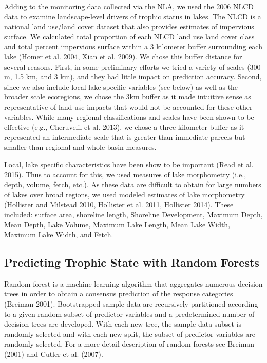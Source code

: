 \documentclass[12pt,]{article}
\begin{document}
Adding to the monitoring data collected via the NLA, we used the 2006
NLCD data to examine landscape-level drivers of trophic status in lakes.
The NLCD is a national land use/land cover dataset that also provides
estimates of impervious surface. We calculated total proportion of each
NLCD land use land cover class and total percent impervious surface
within a 3 kilometer buffer surrounding each lake (Homer et al. 2004,
Xian et al. 2009). We chose this buffer distance for several reasons.
First, in some preliminary efforts we tried a variety of scales (300 m,
1.5 km, and 3 km), and they had little impact on prediction accuracy.
Second, since we also include local lake specific variables (see below)
as well as the broader scale ecoregions, we chose the 3km buffer as it
made intuitive sense as representative of land use impacts that would
not be accounted for these other variables. While many regional
classifications and scales have been shown to be effective (e.g.,
Cheruvelil et al. 2013), we chose a three kilometer buffer as it
represented an intermediate scale that is greater than immediate parcels
but smaller than regional and whole-basin measures.

Local, lake specific characteristics have been show to be important
(Read et al. 2015). Thus to account for this, we used measures of lake
morphometry (i.e., depth, volume, fetch, etc.). As these data are
difficult to obtain for large numbers of lakes over broad regions, we
used modeled estimates of lake morphometry (Hollister and Milstead 2010,
Hollister et al. 2011, Hollister 2014). These included: surface area,
shoreline length, Shoreline Development, Maximum Depth, Mean Depth, Lake
Volume, Maximum Lake Length, Mean Lake Width, Maximum Lake Width, and
Fetch.

\subsection{Predicting Trophic State with Random
Forests}\label{predicting-trophic-state-with-random-forests}

Random forest is a machine learning algorithm that aggregates numerous
decision trees in order to obtain a consensus prediction of the response
categories (Breiman 2001). Bootstrapped sample data are recursively
partitioned according to a given random subset of predictor variables
and a predetermined number of decision trees are developed. With each
new tree, the sample data subset is randomly selected and with each new
split, the subset of predictor variables are randomly selected. For a
more detail description of random forests see Breiman (2001) and Cutler
et al. (2007).
\end{document}
